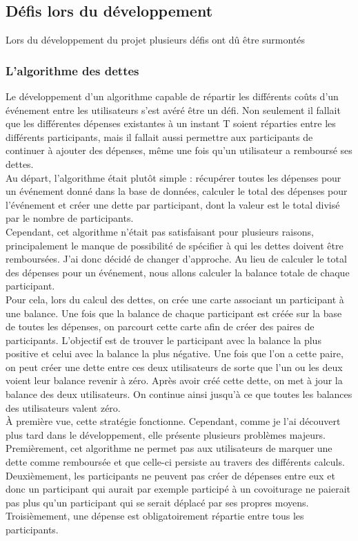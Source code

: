 \subsection{Défis lors du développement}\label{subsec:defits-lors-du-developement}
Lors du développement du projet plusieurs défis ont dû être surmontés

\subsubsection{L'algorithme des dettes}
Le développement d'un algorithme capable de répartir les différents coûts d'un événement entre les utilisateurs s'est avéré être un défi.
Non seulement il fallait que les différentes dépenses existantes à un instant T soient réparties entre les différents participants,
mais il fallait aussi permettre aux participants de continuer à ajouter des dépenses, même une fois qu'un utilisateur a remboursé ses dettes.\\

Au départ, l'algorithme était plutôt simple : récupérer toutes les dépenses pour un événement donné dans la base de données,
calculer le total des dépenses pour l'événement et créer une dette par participant, dont la valeur est le total divisé par le nombre de participants.\\

Cependant, cet algorithme n'était pas satisfaisant pour plusieurs raisons, principalement le manque de possibilité de spécifier
à qui les dettes doivent être remboursées.
J'ai donc décidé de changer d'approche.
Au lieu de calculer le total des dépenses pour un événement, nous allons calculer la balance totale de chaque participant.\\

Pour cela, lors du calcul des dettes, on crée une carte associant un participant à une balance.
Une fois que la balance de chaque participant est créée sur la base de toutes les dépenses, on parcourt cette carte afin de créer des paires de participants.
L'objectif est de trouver le participant avec la balance la plus positive et celui avec la balance la plus négative.
Une fois que l'on a cette paire, on peut créer une dette entre ces deux utilisateurs de sorte que l'un ou les deux voient leur balance revenir à zéro.
Après avoir créé cette dette, on met à jour la balance des deux utilisateurs.
On continue ainsi jusqu'à ce que toutes les balances des utilisateurs valent zéro.\\

À première vue, cette stratégie fonctionne.
Cependant, comme je l'ai découvert plus tard dans le développement, elle présente plusieurs problèmes majeurs.
Premièrement, cet algorithme ne permet pas aux utilisateurs de marquer une dette comme remboursée et que celle-ci persiste au travers des différents calculs.
Deuxièmement, les participants ne peuvent pas créer de dépenses entre eux et donc un participant qui aurait par exemple participé à un covoiturage ne paierait pas plus qu'un participant qui se serait déplacé par ses propres moyens.
Troisièmement, une dépense est obligatoirement répartie entre tous les participants.\\

